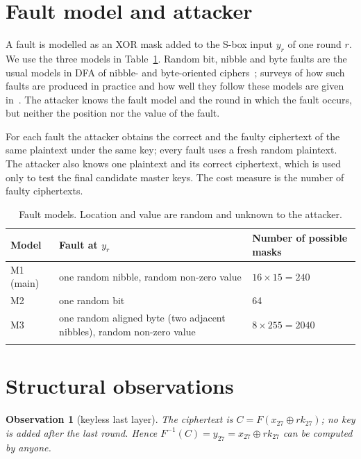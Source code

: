 \documentclass[pdflatex,sn-mathphys-num]{sn-jnl}
\theoremstyle{thmstyleone}%
\newtheorem{observation}{Observation}%
\theoremstyle{thmstylethree}%
\newcommand{\rk}{\mathit{rk}}
\newcommand{\Finv}{F^{-1}}
\begin{document}
\section{Fault model and attacker}\label{sec:model}

A fault is modelled as an XOR mask added to the S-box input $y_r$ of one round $r$. We use the three
models in Table~\ref{tab:models}. Random bit, nibble and byte faults are the usual models in DFA of
nibble- and byte-oriented ciphers~\cite{PiretQ2003,Tunstall2011,Xie2021,Gao2024}; surveys of how such faults
are produced in practice and how well they follow these models are given in~\cite{BarEl2006,Barenghi2012}. The attacker knows the fault model and the round in which the fault
occurs, but neither the position nor the value of the fault.

For each fault the attacker obtains the correct and the faulty ciphertext of the same plaintext under
the same key; every fault uses a fresh random plaintext. The attacker also knows one plaintext and its
correct ciphertext, which is used only to test the final candidate master keys. The cost measure is
the number of faulty ciphertexts.

\begin{table}[t]
\caption{Fault models. Location and value are random and unknown to the attacker.}\label{tab:models}
\begin{tabular}{@{}lll@{}}
\toprule
Model & Fault at $y_r$ & Number of possible masks\\
\midrule
M1 (main) & one random nibble, random non-zero value & $16\times 15 = 240$\\
M2 & one random bit & 64\\
M3 & one random aligned byte (two adjacent nibbles), random non-zero value & $8\times 255 = 2040$\\
\botrule
\end{tabular}
\end{table}

\section{Structural observations}\label{sec:obs}

\begin{observation}[keyless last layer]\label{obs:last}
The ciphertext is $C = F(x_{27}\oplus \rk_{27})$; no key is added after the last round. Hence
$\Finv(C) = y_{27} = x_{27}\oplus\rk_{27}$ can be computed by anyone.
\end{observation}
\end{document}
